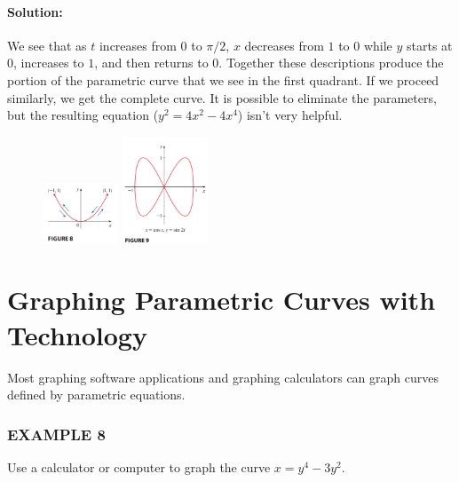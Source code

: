 \documentclass{article}
\begin{document}
\paragraph{Solution:} We see that as $t$ increases from $0$ to $\pi/2$, $x$ decreases from $1$ to $0$ while $y$ starts at $0$, increases to $1$, and then returns to $0$. Together these descriptions produce the portion of the parametric curve that we see in the first quadrant. If we proceed similarly, we get the complete curve. It is possible to eliminate the parameters, but the resulting equation ($y^2 = 4x^2 - 4x^4$) isn’t very helpful.

\begin{figure}[htbp]
    \centering
    \includegraphics[width=0.2\textwidth]{graph23.png}
    \includegraphics[width=0.23\textwidth]{graph24.png}  %
\end{figure}

\section*{Graphing Parametric Curves with Technology}
Most graphing software applications and graphing calculators can graph curves defined by parametric equations.

\subsubsection*{EXAMPLE 8}
Use a calculator or computer to graph the curve $x = y^4 - 3y^2$.
\end{document}

